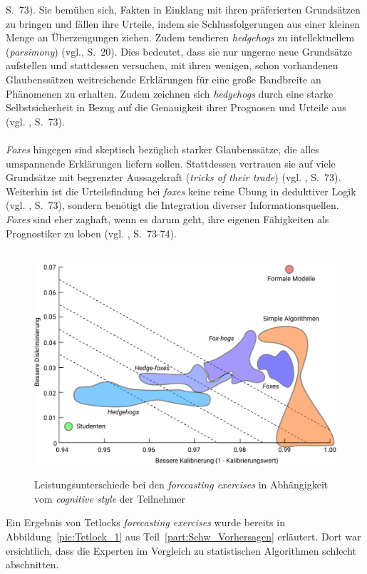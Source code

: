 S.~73). Sie bemühen sich, Fakten in Einklang mit ihren präferierten Grundsätzen
zu bringen und fällen ihre Urteile, indem sie Schlussfolgerungen aus einer
kleinen Menge an Überzeugungen ziehen. Zudem tendieren \emph{hedgehogs}
zu intellektuellem \grqq (\emph{parsimony}) (vgl.\cite{Tetlock}, 
S.~20). Dies bedeutet, dass sie nur ungerne neue Grundsätze
aufstellen und stattdessen versuchen, mit ihren wenigen, schon vorhandenen
Glaubenssätzen weitreichende Erklärungen für eine große Bandbreite an Phänomenen
zu erhalten. Zudem zeichnen sich \emph{hedgehogs} durch eine starke
Selbstsicherheit in Bezug auf die Genauigkeit ihrer Prognosen und Urteile aus
(vgl. \cite{Tetlock}, S.~73). \\ \\
\emph{Foxes} hingegen sind skeptisch bezüglich starker Glaubenssätze, die alles
umspannende Erklärungen liefern sollen. Stattdessen vertrauen sie auf viele
Grundsätze mit begrenzter Aussagekraft (\emph{tricks of their trade}) (vgl.
\cite{Tetlock}, S.~73). Weiterhin ist die Urteilsfindung bei \emph{foxes} keine
reine Übung in deduktiver Logik (vgl. \cite{Tetlock}, S.~73), sondern benötigt
die Integration diverser Informationsquellen. \emph{Foxes} sind eher zaghaft,
wenn es darum geht, ihre eigenen Fähigkeiten als Prognostiker zu loben (vgl.
\cite{Tetlock}, S.~73-74). \\ \\
\begin{figure}%
\centering
\caption{Leistungsunterschiede bei den \emph{forecasting exercises} in
  Abhängigkeit vom \emph{cognitive style} der Teilnehmer}
\includegraphics[scale=0.88]{Grafiken/Tetlock_2_Ink.pdf} 
\label{pic:Tetlock_2}
\end{figure}
Ein Ergebnis von Tetlocks \emph{forecasting exercises} wurde bereits in
Abbildung~\ref{pic:Tetlock_1} aus Teil~\ref{part:Schw_Vorhersagen} erläutert.
Dort war ersichtlich, dass die Experten im Vergleich zu statistischen
Algorithmen schlecht abschnitten. 

